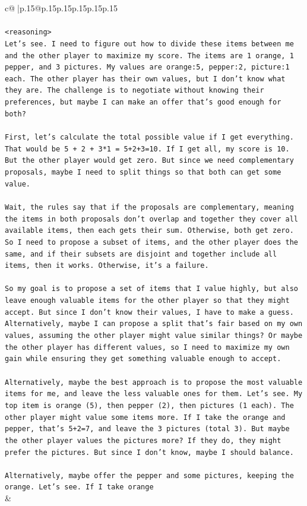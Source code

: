\documentclass{article}
\begin{document}
{\begin{supertabular}{c@{$\;$}|p{.15\linewidth}@{}p{.15\linewidth}p{.15\linewidth}p{.15\linewidth}p{.15\linewidth}p{.15\linewidth}}
{{{\\ 
\\ 
\texttt{<reasoning>} \\
\texttt{Let's see. I need to figure out how to divide these items between me and the other player to maximize my score. The items are 1 orange, 1 pepper, and 3 pictures. My values are orange:5, pepper:2, picture:1 each. The other player has their own values, but I don't know what they are. The challenge is to negotiate without knowing their preferences, but maybe I can make an offer that's good enough for both?} \\
\\ 
\texttt{First, let's calculate the total possible value if I get everything. That would be 5 + 2 + 3*1 = 5+2+3=10. If I get all, my score is 10. But the other player would get zero. But since we need complementary proposals, maybe I need to split things so that both can get some value.} \\
\\ 
\texttt{Wait, the rules say that if the proposals are complementary, meaning the items in both proposals don't overlap and together they cover all available items, then each gets their sum. Otherwise, both get zero. So I need to propose a subset of items, and the other player does the same, and if their subsets are disjoint and together include all items, then it works. Otherwise, it's a failure.} \\
\\ 
\texttt{So my goal is to propose a set of items that I value highly, but also leave enough valuable items for the other player so that they might accept. But since I don't know their values, I have to make a guess. Alternatively, maybe I can propose a split that's fair based on my own values, assuming the other player might value similar things? Or maybe the other player has different values, so I need to maximize my own gain while ensuring they get something valuable enough to accept.} \\
\\ 
\texttt{Alternatively, maybe the best approach is to propose the most valuable items for me, and leave the less valuable ones for them. Let's see. My top item is orange (5), then pepper (2), then pictures (1 each). The other player might value some items more. If I take the orange and pepper, that's 5+2=7, and leave the 3 pictures (total 3). But maybe the other player values the pictures more? If they do, they might prefer the pictures. But since I don't know, maybe I should balance.} \\
\\ 
\texttt{Alternatively, maybe offer the pepper and some pictures, keeping the orange. Let's see. If I take orange} \\
            }
        }
    }
    & \\ \\


\end{supertabular}}
\end{document}

